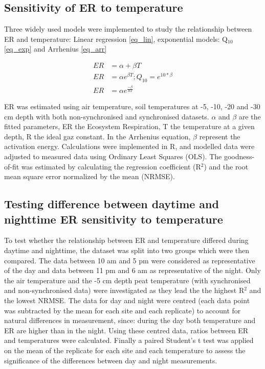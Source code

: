 \subsection{Sensitivity of ER to temperature}
Three widely used models \citet{fang2001} were implemented to study the relationship between ER and temperature: Linear regression \eqref{eq_lin}, exponential models: Q$_{10}$ \eqref{eq_exp} and Arrhenius \eqref{eq_arr}

\begin{align}
ER & = \alpha + \beta T \label{eq_lin}\\
ER & = \alpha e^{\beta T} ; Q_{10}=e^{10*\beta} \label{eq_exp}\\
ER & = \alpha e^{\frac{-\beta}{RT}} \label{eq_arr}
\end{align}

ER was estimated using air temperature, soil temperatures at -5, -10, -20 and -30 cm depth with both non-synchronised and synchronised datasets.
$\alpha$ and $\beta$ are the fitted parameters, ER the Ecosystem Respiration, T the temperature at a given depth, R the ideal gaz constant.
In the Arrhenius equation, $\beta$ represent the activation energy.
Calculations were implemented in R, and modelled data were adjusted to measured data using Ordinary Least Squares (OLS).
The goodness-of-fit was estimated by calculating the regression coefficient (R$^{2}$) and the root mean square error normalized by the mean (NRMSE).

\subsection{Testing difference between daytime and nighttime ER sensitivity to temperature}

To test whether the relationship between ER and temperature differed during daytime and nighttime, the dataset was split into two groups which were then compared.
The data between 10 am and 5 pm were considered as representative of the day and data between 11 pm and 6 am as representative of the night.
Only the air temperature and the -5 cm depth peat temperature (with synchronised and non-synchronised data) were investigated as they lead the the highest R$^{2}$ and the lowest NRMSE.
The data for day and night were centred (each data point was subtracted by the mean for each site and each replicate) to account for natural differences in measurement, since: during the day both temperature and ER are higher than in the night.
Using these centred data, ratios between ER and temperatures were calculated.
Finally a paired Student's t test was applied on the mean of the replicate for each site and each temperature to assess the significance of the differences between day and night measurements.

